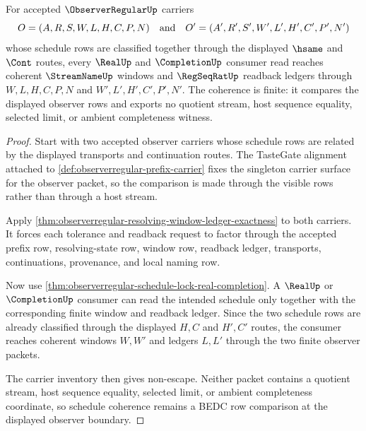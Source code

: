 \begin{theorem}
\label{thm:observerregular-schedule-coherence}
For accepted $\ObserverRegularUp$ carriers
$$
O=(A,R,S,W,L,H,C,P,N)
\quad\hbox{and}\quad
O'=(A',R',S',W',L',H',C',P',N')
$$
whose schedule rows are classified together through the displayed $\hsame$ and $\Cont$ routes, every $\RealUp$ and $\CompletionUp$ consumer read reaches coherent $\StreamNameUp$ windows and $\RegSeqRatUp$ readback ledgers through $W,L,H,C,P,N$ and $W',L',H',C',P',N'$. The coherence is finite: it compares the displayed observer rows and exports no quotient stream, host sequence equality, selected limit, or ambient completeness witness.
\end{theorem}
\begin{proof}
Start with two accepted observer carriers whose schedule rows are related by the displayed transports and continuation routes. The TasteGate alignment attached to \autoref{def:observerregular-prefix-carrier} fixes the singleton carrier surface for the observer packet, so the comparison is made through the visible rows rather than through a host stream.

Apply \autoref{thm:observerregular-resolving-window-ledger-exactness} to both carriers. It forces each tolerance and readback request to factor through the accepted prefix row, resolving-state row, window row, readback ledger, transports, continuations, provenance, and local naming row.

Now use \autoref{thm:observerregular-schedule-lock-real-completion}. A $\RealUp$ or $\CompletionUp$ consumer can read the intended schedule only together with the corresponding finite window and readback ledger. Since the two schedule rows are already classified through the displayed $H,C$ and $H',C'$ routes, the consumer reaches coherent windows $W,W'$ and ledgers $L,L'$ through the two finite observer packets.

The carrier inventory then gives non-escape. Neither packet contains a quotient stream, host sequence equality, selected limit, or ambient completeness coordinate, so schedule coherence remains a BEDC row comparison at the displayed observer boundary.
\end{proof}

